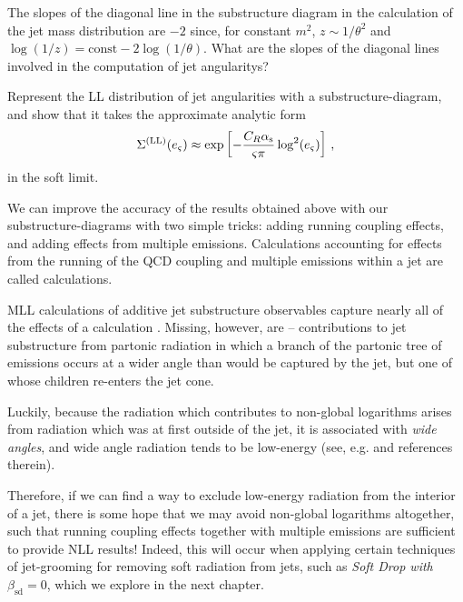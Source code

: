 \begin{exercise}
    \label{ex:ll-angularity-radiator}
    The slopes of the diagonal line in the substructure diagram in the calculation of the jet mass distribution are \(-2\) since, for constant \(m^2\), \(z \sim 1/\theta^2\) and \(\log(1/z) = \text{const} - 2 \log(1/\theta)\).
    What are the slopes of the diagonal lines involved in the computation of jet \glspl{angularity}?

    Represent the LL distribution of jet angularities with a \gls{substructure-diagram}, and show that it takes the approximate analytic form
    \begin{align}
        \Sigma^{(\text{LL})}(e_\varsigma)
        \approx
        \exp\left[
            -\frac{C_R\alpha_{\mathrm{s}}}{\varsigma \pi}\log^2(e_\varsigma)
        \right]
        \,,
    \end{align}
    in the soft limit.
\end{exercise}

We can improve the accuracy of the results obtained above with our \glspl{substructure-diagram} with two simple tricks:
%
adding running coupling effects, and adding effects from multiple emissions.
%
Calculations accounting for effects from the running of the QCD coupling and multiple emissions within a jet are called  calculations.

MLL calculations of additive jet substructure observables capture nearly all of the effects of a  calculation \cite{Marzani:2019hun}.
%
Missing, however, are  -- contributions to jet substructure from partonic radiation in which a branch of the partonic tree of emissions occurs at a wider angle than would be captured by the jet, but one of whose children re-enters the jet cone.\cite{Dasgupta:2001sh,Appleby:2002ke,Weigert:2003mm,Rubin:2010fc,Banfi:2010pa,Hornig:2011iu,Kelley:2011aa,Hatta:2013iba,Schwartz:2014wha,Khelifa-Kerfa:2015mma,Larkoski:2016zzc,Marzani:2019hun,Banfi:2021owj,Banfi:2021xzn}

Luckily, because the radiation which contributes to non-global logarithms arises from radiation which was at first outside of the jet, it is associated with \textit{wide angles}, and wide angle radiation tends to be low-energy (see, e.g.  and references therein).

Therefore, if we can find a way to exclude low-energy radiation from the interior of a jet, there is some hope that we may avoid non-global logarithms altogether, such that running coupling effects together with multiple emissions are sufficient to provide NLL results!
%
Indeed, this will occur when applying certain techniques of \gls{jet-grooming} for removing soft radiation from jets, such as \textit{Soft Drop with \(\beta_\text{sd}= 0\)}, which we explore in the next chapter.


